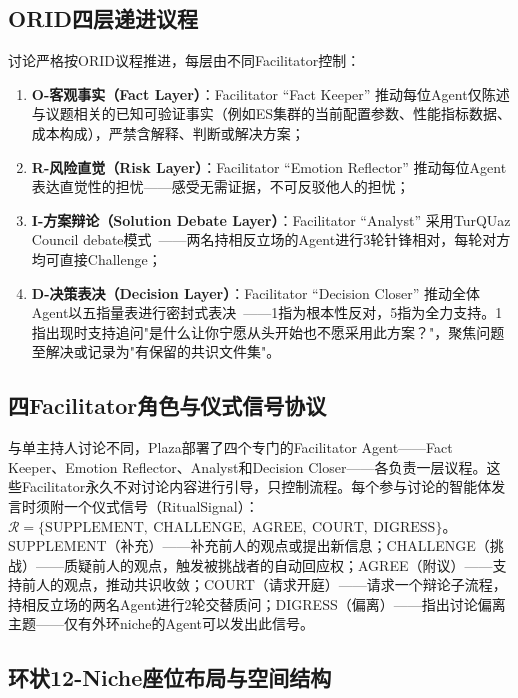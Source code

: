 \documentclass[twocolumn,10.5pt]{ctexart}
\begin{document}
\subsection{ORID四层递进议程}

讨论严格按ORID议程推进，每层由不同Facilitator控制：

\begin{enumerate}[itemsep=0pt,topsep=0pt]
  \item \textbf{O-客观事实（Fact Layer）}：Facilitator ``Fact Keeper'' 推动每位Agent仅陈述与议题相关的已知可验证事实（例如ES集群的当前配置参数、性能指标数据、成本构成），严禁含解释、判断或解决方案；
  \item \textbf{R-风险直觉（Risk Layer）}：Facilitator ``Emotion Reflector'' 推动每位Agent表达直觉性的担忧——感受无需证据，不可反驳他人的担忧；
  \item \textbf{I-方案辩论（Solution Debate Layer）}：Facilitator ``Analyst'' 采用TurQUaz Council debate模式~\cite{gungor2025turquaz}——两名持相反立场的Agent进行3轮针锋相对，每轮对方均可直接Challenge；
  \item \textbf{D-决策表决（Decision Layer）}：Facilitator ``Decision Closer'' 推动全体Agent以五指量表进行密封式表决~\cite{kaner2014facilitator}——1指为根本性反对，5指为全力支持。1指出现时支持追问"是什么让你宁愿从头开始也不愿采用此方案？"，聚焦问题至解决或记录为"有保留的共识文件集"。
\end{enumerate}

\subsection{四Facilitator角色与仪式信号协议}

与单主持人讨论不同，Plaza部署了四个专门的Facilitator Agent——Fact Keeper、Emotion Reflector、Analyst和Decision Closer——各负责一层议程。这些Facilitator永久不对讨论内容进行引导，只控制流程。每个参与讨论的智能体发言时须附一个仪式信号（RitualSignal）：
$\mathcal{R} = \{\mathrm{SUPPLEMENT},\ \mathrm{CHALLENGE},\ \mathrm{AGREE},\ \mathrm{COURT},\ \mathrm{DIGRESS}\}$。
SUPPLEMENT（补充）——补充前人的观点或提出新信息；CHALLENGE（挑战）——质疑前人的观点，触发被挑战者的自动回应权；AGREE（附议）——支持前人的观点，推动共识收敛；COURT（请求开庭）——请求一个辩论子流程，持相反立场的两名Agent进行2轮交替质问；DIGRESS（偏离）——指出讨论偏离主题——仅有外环niche的Agent可以发出此信号。

\subsection{环状12-Niche座位布局与空间结构}
\end{document}
